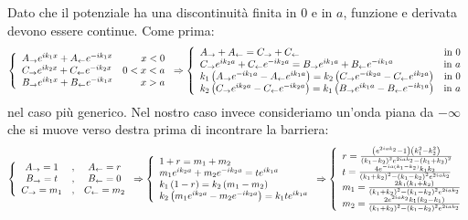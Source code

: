 Dato che il potenziale ha una discontinuit\`a finita in $0$ e in $a$, funzione e derivata devono essere continue. Come prima:
\begin{equation}
  \lr\{.{\begin{array}{lr}
      A_\to e^{ik_1x} + A_\from e^{-ik_1x}	&	x<0\\
      C_\to e^{ik_2x} + C_\from e^{-ik_2x}	&	0<x<a\\
      B_\to e^{ik_1x} + B_\from e^{-ik_1x}	&	x>a
  \end{array}}\Rightarrow\lr\{.{\begin{array}{lr}
      A_\to  +A_\from = C_\to+C_\from															&	\text{in }0\\
      C_\to e^{ik_2a}+C_\from e^{-ik_2a} = B_\to e^{ik_1a} +B_\from e^{-ik_1a}				&	\text{in }a\\
      k_1\lrt{A_\to e^{-ik_1a}-A_\from e^{ik_1a}}=k_2\lrt{C_\to e^{-ik_2a}-C_\from e^{ik_2a}}	&	\text{in }0\\
      k_2\lrt{C_\to e^{ik_2a}-C_\from e^{-ik_2a}}=k_1\lrt{B_\to e^{ik_1a}-B_\from e^{-ik_1a}}	&	\text{in }a
  \end{array}}
\end{equation}
nel caso pi\`u generico. Nel nostro caso invece consideriamo un'onda piana da $-\infty$ che si muove verso destra prima di incontrare la barriera:
\begin{equation}
  \lr\{.{\begin{array}{ccc}
      A_\to = 1&,&
      A_\from = r\\
      B_\to = t&,&
      B_\from=0\\
      C_\to = m_1&,&
      C_\from=m_2
  \end{array}} \Rightarrow\lr\{.{\begin{array}{l}
      1+r= m_1 +m_2 \\
      m_1 e^{ik_2a}+m_2 e^{-ik_2a} = t e^{ik_1a}\\
      k_1\lrt{1 - r}=k_2\lrt{m_1 - m_2}\\
      k_2\lrt{m_1 e^{ik_2a}-m_2 e^{-ik_2a}}=k_1 t e^{ik_1a}
  \end{array}} \Rightarrow\lr\{.{\begin{array}{l}
      r	= \frac{\lrt{e^{2 i a k_2}-1}\lrt{k_1^2-k_2^2}}{\lrt{k_1-k_2}^2 e^{2 i a k_2}-\lrt{k_1+k_2}^2}\\
      t	= \frac{4 e^{-i a \lrt{k_1-k_2}} k_1 k_2}{\lrt{k_1+k_2}^2-\lrt{k_1-k_2}^2 e^{2 i a k_2}}\\
      m_1	= \frac{2k_1\lrt{k_1+k_2}}{\lrt{k_1+k_2}^2-\lrt{k_1-k_2}^2 e^{2 i a k_2}}\\
      m_2	= \frac{2 e^{2 i a k_2}k_1\lrt{k_2-k_1}}{\lrt{k_1+k_2}^2-\lrt{k_1-k_2}^2 e^{2 i a k_2}}
  \end{array}}
\end{equation}

